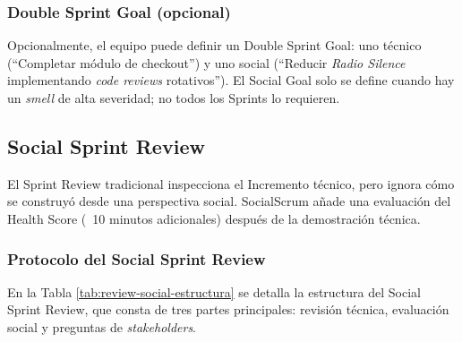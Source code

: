 \subsubsection{Double Sprint Goal (opcional)}

Opcionalmente, el equipo puede definir un Double Sprint Goal: uno técnico (``Completar módulo de checkout'') y uno social (``Reducir \textit{Radio Silence} implementando \textit{code reviews} rotativos''). El Social Goal solo se define cuando hay un \textit{smell} de alta severidad; no todos los Sprints lo requieren.

\subsection{Social Sprint Review}

El Sprint Review tradicional \cite{schwaber2020scrum} inspecciona el Incremento técnico, pero ignora cómo se construyó desde una perspectiva social. SocialScrum añade una evaluación del Health Score (~10 minutos adicionales) después de la demostración técnica.

\subsubsection{Protocolo del Social Sprint Review}

En la Tabla \ref{tab:review-social-estructura} se detalla la estructura del Social Sprint Review, que consta de tres partes principales: revisión técnica, evaluación social y preguntas de \textit{stakeholders}.

\begingroup
\scriptsize
\renewcommand{\arraystretch}{1.4}
\setlength{\tabcolsep}{4pt}
\setlength{\LTleft}{0pt}
\setlength{\LTright}{0pt}

